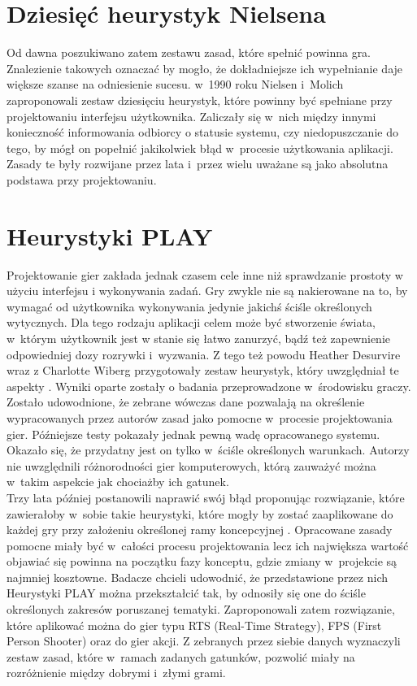 \documentclass[a4paper,12pt,numbers=noenddot]{report}
\begin{document}
\section{Dziesięć heurystyk Nielsena}
Od dawna poszukiwano zatem zestawu zasad, które spełnić powinna gra. Znalezienie takowych oznaczać by mogło, że dokładniejsze ich wypełnianie daje większe szanse na odniesienie sucesu. w~1990 roku Nielsen i~Molich \cite{art_Nielsen} zaproponowali zestaw dziesięciu heurystyk, które powinny być spełniane przy projektowaniu interfejsu użytkownika. Zaliczały się w~nich między innymi konieczność informowania odbiorcy o statusie systemu, czy niedopuszczanie do tego, by mógł on popełnić jakikolwiek błąd w~procesie użytkowania aplikacji. Zasady te były rozwijane przez lata i~przez wielu uważane są jako absolutna podstawa przy projektowaniu. 

\section{Heurystyki PLAY}
Projektowanie gier zakłada jednak czasem cele inne niż sprawdzanie prostoty w użyciu interfejsu i wykonywania zadań. Gry zwykle nie są nakierowane na to, by wymagać od użytkownika wykonywania jedynie jakichś ściśle określonych wytycznych. Dla tego rodzaju aplikacji celem może być stworzenie świata, w~którym użytkownik jest w stanie się łatwo zanurzyć, bądź też zapewnienie odpowiedniej dozy rozrywki i~wyzwania. Z tego też powodu Heather Desurvire wraz z Charlotte Wiberg przygotowały zestaw heurystyk, który uwzględniał te aspekty \cite{art_PLAY1}. Wyniki oparte zostały o badania przeprowadzone w~środowisku graczy. Zostało udowodnione, że zebrane wówczas dane pozwalają na określenie wypracowanych przez autorów zasad jako pomocne w~procesie projektowania gier. Późniejsze testy pokazały jednak pewną wadę opracowanego systemu. Okazało się, że przydatny jest on tylko w~ściśle określonych warunkach. Autorzy nie uwzględnili różnorodności gier komputerowych, którą zauważyć można w~takim aspekcie jak chociażby ich gatunek. \\
Trzy lata później postanowili naprawić swój błąd proponując rozwiązanie, które zawierałoby w~sobie takie heurystyki, które mogły by zostać zaaplikowane do każdej gry przy założeniu określonej ramy koncepcyjnej \cite{art_PLAY2}. Opracowane zasady pomocne miały być w~całości procesu projektowania lecz ich największa wartość objawiać się powinna na początku fazy konceptu, gdzie zmiany w~projekcie są najmniej kosztowne. Badacze chcieli udowodnić, że przedstawione przez nich Heurystyki PLAY można przekształcić tak, by odnosiły się one do ściśle określonych zakresów poruszanej tematyki. Zaproponowali zatem rozwiązanie, które aplikować można do gier typu RTS (Real-Time Strategy), FPS (First Person Shooter) oraz do gier akcji. Z zebranych przez siebie danych wyznaczyli zestaw zasad, które w~ramach zadanych gatunków, pozwolić miały na rozróżnienie między dobrymi i~złymi grami. 
\end{document}

